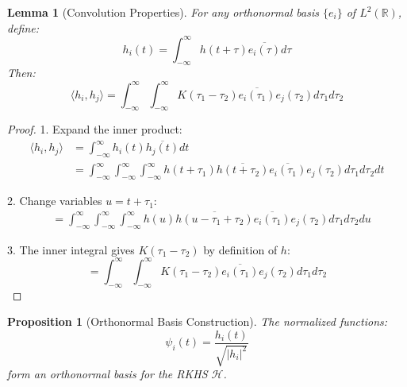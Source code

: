 \documentclass{article}
\newtheorem{lemma}[theorem]{Lemma}
\newtheorem{proposition}[theorem]{Proposition}
\begin{document}
\begin{lemma}[Convolution Properties]
For any orthonormal basis $\{e_i\}$ of $L^2(\mathbb{R})$, define:
\begin{equation}
    h_i(t) = \int_{-\infty}^{\infty} h(t+\tau)\overline{e_i(\tau)}d\tau
\end{equation}
Then:
\begin{equation}
    \langle h_i, h_j \rangle = \int_{-\infty}^{\infty}\int_{-\infty}^{\infty} K(\tau_1-\tau_2)\overline{e_i(\tau_1)}e_j(\tau_2)d\tau_1d\tau_2
\end{equation}
\end{lemma}

\begin{proof}
1. Expand the inner product:
\begin{align*}
    \langle h_i, h_j \rangle &= \int_{-\infty}^{\infty} h_i(t)\overline{h_j(t)}dt \\
    &= \int_{-\infty}^{\infty} \int_{-\infty}^{\infty}\int_{-\infty}^{\infty} h(t+\tau_1)\overline{h(t+\tau_2)}\overline{e_i(\tau_1)}e_j(\tau_2)d\tau_1d\tau_2dt
\end{align*}

2. Change variables $u = t+\tau_1$:
\begin{align*}
    &= \int_{-\infty}^{\infty}\int_{-\infty}^{\infty}\int_{-\infty}^{\infty} h(u)\overline{h(u-\tau_1+\tau_2)}\overline{e_i(\tau_1)}e_j(\tau_2)d\tau_1d\tau_2du
\end{align*}

3. The inner integral gives $K(\tau_1-\tau_2)$ by definition of $h$:
\begin{equation*}
    = \int_{-\infty}^{\infty}\int_{-\infty}^{\infty} K(\tau_1-\tau_2)\overline{e_i(\tau_1)}e_j(\tau_2)d\tau_1d\tau_2
\end{equation*}
\end{proof}

\begin{proposition}[Orthonormal Basis Construction]
The normalized functions:
\begin{equation}
    \psi_i(t) = \frac{h_i(t)}{\sqrt{|h_i|^2}}
\end{equation}
form an orthonormal basis for the RKHS $\mathcal{H}$.
\end{proposition}
\end{document}
